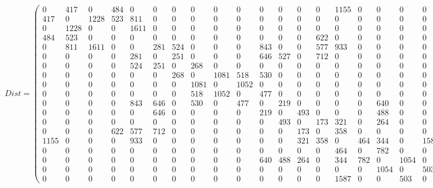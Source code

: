 \begin{sidewaysfigure}

\[
Dist=
  \begin{pmatrix}
    0 & 417 & 0 & 484 & 0 & 0 & 0 & 0 & 0 & 0 & 0 & 0 & 0 & 0 & 1155 & 0 & 0 & 0 & 0 \\
    417 & 0 & 1228 & 523 & 811 & 0 & 0 & 0 & 0 & 0 & 0 & 0 & 0 & 0 & 0 & 0 & 0 & 0 & 0 \\
    0 & 1228 & 0 & 0 & 1611 & 0 & 0 & 0 & 0 & 0 & 0 & 0 & 0 & 0 & 0 & 0 & 0 & 0 & 0 \\
    484 & 523 & 0 & 0 & 0 & 0 & 0 & 0 & 0 & 0 & 0 & 0 & 0 & 622 & 0 & 0 & 0 & 0 & 0 \\
    0 & 811 & 1611 & 0 & 0 & 281 & 524 & 0 & 0 & 0 & 843 & 0 & 0 & 577 & 933 & 0 & 0 & 0 & 0 \\
    0 & 0 & 0 & 0 & 281 & 0 & 251 & 0 & 0 & 0 & 646 & 527 & 0 & 712 & 0 & 0 & 0 & 0 & 0 \\
    0 & 0 & 0 & 0 & 524 & 251 & 0 & 268 & 0 & 0 & 0 & 0 & 0 & 0 & 0 & 0 & 0 & 0 & 0 \\
    0 & 0 & 0 & 0 & 0 & 0 & 268 & 0 & 1081 & 518 & 530 & 0 & 0 & 0 & 0 & 0 & 0 & 0 & 0 \\
    0 & 0 & 0 & 0 & 0 & 0 & 0 & 1081 & 0 & 1052 & 0 & 0 & 0 & 0 & 0 & 0 & 0 & 0 & 0 \\
    0 & 0 & 0 & 0 & 0 & 0 & 0 & 518 & 1052 & 0 & 477 & 0 & 0 & 0 & 0 & 0 & 0 & 0 & 0 \\
    0 & 0 & 0 & 0 & 843 & 646 & 0 & 530 & 0 & 477 & 0 & 219 & 0 & 0 & 0 & 0 & 640 & 0 & 0 \\
    0 & 0 & 0 & 0 & 0 & 646 & 0 & 0 & 0 & 0 & 219 & 0 & 493 & 0 & 0 & 0 & 488 & 0 & 0 \\
    0 & 0 & 0 & 0 & 0 & 0 & 0 & 0 & 0 & 0 & 0 & 493 & 0 & 173 & 321 & 0 & 264 & 0 & 0 \\
    0 & 0 & 0 & 622 & 577 & 712 & 0 & 0 & 0 & 0 & 0 & 0 & 173 & 0 & 358 & 0 & 0 & 0 & 0 \\
    1155 & 0 & 0 & 0 & 933 & 0 & 0 & 0 & 0 & 0 & 0 & 0 & 321 & 358 & 0 & 464 & 344 & 0 & 1587 \\
    0 & 0 & 0 & 0 & 0 & 0 & 0 & 0 & 0 & 0 & 0 & 0 & 0 & 0 & 464 & 0 & 782 & 0 & 0 \\
    0 & 0 & 0 & 0 & 0 & 0 & 0 & 0 & 0 & 0 & 640 & 488 & 264 & 0 & 344 & 782 & 0 & 1054 & 0 \\
    0 & 0 & 0 & 0 & 0 & 0 & 0 & 0 & 0 & 0 & 0 & 0 & 0 & 0 & 0 & 0 & 1054 & 0 & 503 \\
    0 & 0 & 0 & 0 & 0 & 0 & 0 & 0 & 0 & 0 & 0 & 0 & 0 & 0 & 1587 & 0 & 0 & 503 & 0
  \end{pmatrix}
\]
\end{sidewaysfigure}

